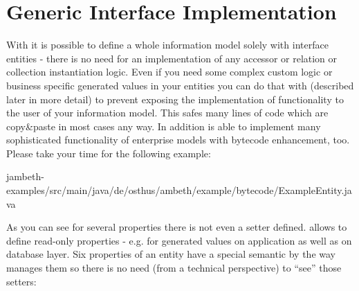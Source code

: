 \section{Generic Interface Implementation}
\label{feature:InterfaceImpl}
With \AMBETH{} it is possible to define a whole information model solely with interface entities - there is no need for an implementation of any accessor or relation or collection instantiation logic. Even if you need some complex custom logic or business specific generated values in your entities you can do that with  (described later in more detail) to prevent exposing the implementation of functionality to the user of your information model. This safes many lines of code which are copy\&paste in most cases any way. In addition \AMBETH{} is able to implement many sophisticated functionality of enterprise models with bytecode enhancement, too. Please take your time for the following example:

	{jambeth-examples/src/main/java/de/osthus/ambeth/example/bytecode/ExampleEntity.java}

As you can see for several properties there is not even a setter defined. \AMBETH{} allows to define read-only properties - e.g. for generated values on application as well as on database layer. Six properties of an entity have a special semantic by the way \AMBETH{} manages them so there is no need (from a technical perspective) to ``see'' those setters:

